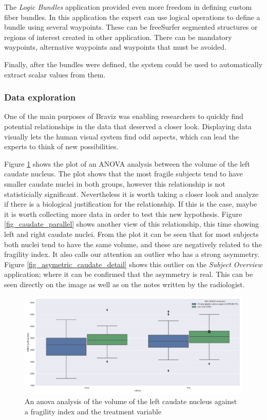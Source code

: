 The \emph{Logic Bundles} application provided even more freedom in defining custom fiber bundles. In this application the expert can use logical operations to define a bundle using several waypoints. These can be freeSurfer segmented structures or regions of interest created in other application. There can be mandatory waypoints, alternative waypoints and waypoints that must be avoided. 

Finally, after the bundles were defined, the system could be used to automatically extract scalar values from them. 



\subsubsection{Data exploration}

One of the main purposes of Braviz was enabling researchers to quickly find potential relationships in the data that deserved a closer look. Displaying data visually lets the human visual system find odd aspects, which can lead the experts to think of new possibilities. 

Figure \ref{fig_anova_example} shows the plot of an ANOVA analysis between the volume of the left caudate nucleus. The plot shows that the most fragile subjects tend to have smaller caudate nuclei in both groups, however this relationship is not statisticially significant. Nevertheless it is worth taking a closer look and analyze if there is a biological justification for the relationship. If this is the case, maybe it is worth collecting more data in order to test this new hypothesis. Figure \ref{fig_caudate_parallel} shows another view of this relationship, this time showing left and right caudate nuclei. From the plot it can be seen that for most subjects both nuclei tend to have the same volume, and these are negatively related to the fragility index. It also calls our attention an outlier who has a strong asymmetry. Figure \ref{fig_asymetric_caudate_detail} shows this outlier on the \emph{Subject Overview} application; where it can be confirmed that the asymmetry is real. This can be seen directly on the image as well as on the notes written by the radiologist.


\begin{figure}
	\centering
		\includegraphics[width=\textwidth]{figures/kmc400/left_caudate_fragility_anova}
	\caption{An anova analysis of the volume of the left caudate nucleus against a fragility index and the treatment variable}
	\label{fig_anova_example}
\end{figure}



